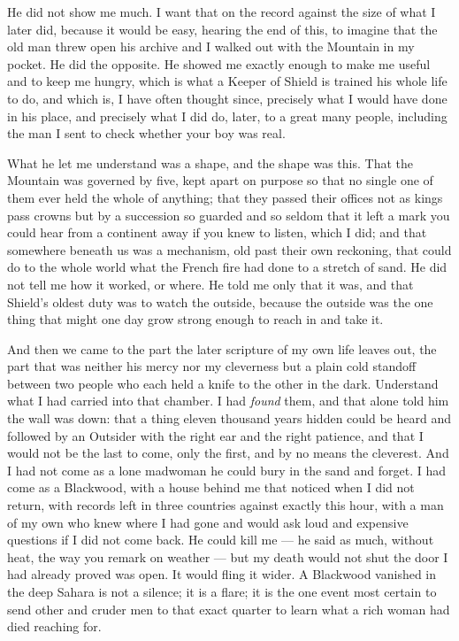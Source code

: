 He did not show me much. I want that on the record against the size of what I later did, because it would be easy, hearing the end of this, to imagine that the old man threw open his archive and I walked out with the Mountain in my pocket. He did the opposite. He showed me exactly enough to make me useful and to keep me hungry, which is what a Keeper of Shield is trained his whole life to do, and which is, I have often thought since, precisely what I would have done in his place, and precisely what I did do, later, to a great many people, including the man I sent to check whether your boy was real.\par

What he let me understand was a shape, and the shape was this. That the Mountain was governed by five, kept apart on purpose so that no single one of them ever held the whole of anything; that they passed their offices not as kings pass crowns but by a succession so guarded and so seldom that it left a mark you could hear from a continent away if you knew to listen, which I did; and that somewhere beneath us was a mechanism, old past their own reckoning, that could do to the whole world what the French fire had done to a stretch of sand. He did not tell me how it worked, or where. He told me only that it was, and that Shield's oldest duty was to watch the outside, because the outside was the one thing that might one day grow strong enough to reach in and take it.\par

And then we came to the part the later scripture of my own life leaves out, the part that was neither his mercy nor my cleverness but a plain cold standoff between two people who each held a knife to the other in the dark. Understand what I had carried into that chamber. I had \emph{found} them, and that alone told him the wall was down: that a thing eleven thousand years hidden could be heard and followed by an Outsider with the right ear and the right patience, and that I would not be the last to come, only the first, and by no means the cleverest. And I had not come as a lone madwoman he could bury in the sand and forget. I had come as a Blackwood, with a house behind me that noticed when I did not return, with records left in three countries against exactly this hour, with a man of my own who knew where I had gone and would ask loud and expensive questions if I did not come back. He could kill me --- he said as much, without heat, the way you remark on weather --- but my death would not shut the door I had already proved was open. It would fling it wider. A Blackwood vanished in the deep Sahara is not a silence; it is a flare; it is the one event most certain to send other and cruder men to that exact quarter to learn what a rich woman had died reaching for.\par

